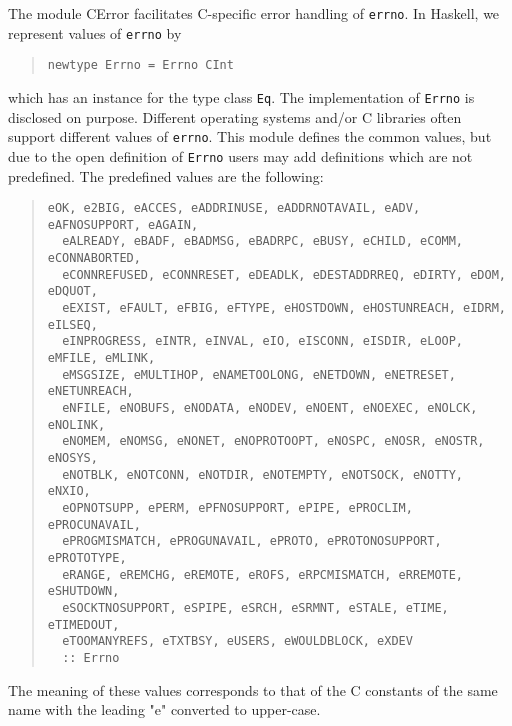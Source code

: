 \documentclass[a4paper,twoside]{article}
\newcommand{\code}[1]{\texttt{#1}}      %
\begin{document}
The module CError facilitates C-specific error handling of \code{errno}.  In
Haskell, we represent values of \code{errno} by
%
\begin{quote}
\begin{verbatim}
newtype Errno = Errno CInt
\end{verbatim}
\end{quote}
%
which has an instance for the type class \code{Eq}.  The implementation of
\code{Errno} is disclosed on purpose.  Different operating systems and/or C
libraries often support different values of \code{errno}.  This module defines
the common values, but due to the open definition of \code{Errno} users may
add definitions which are not predefined.  The predefined values are the
following:
%
\begin{quote}
\begin{verbatim}
eOK, e2BIG, eACCES, eADDRINUSE, eADDRNOTAVAIL, eADV, eAFNOSUPPORT, eAGAIN, 
  eALREADY, eBADF, eBADMSG, eBADRPC, eBUSY, eCHILD, eCOMM, eCONNABORTED, 
  eCONNREFUSED, eCONNRESET, eDEADLK, eDESTADDRREQ, eDIRTY, eDOM, eDQUOT, 
  eEXIST, eFAULT, eFBIG, eFTYPE, eHOSTDOWN, eHOSTUNREACH, eIDRM, eILSEQ, 
  eINPROGRESS, eINTR, eINVAL, eIO, eISCONN, eISDIR, eLOOP, eMFILE, eMLINK, 
  eMSGSIZE, eMULTIHOP, eNAMETOOLONG, eNETDOWN, eNETRESET, eNETUNREACH, 
  eNFILE, eNOBUFS, eNODATA, eNODEV, eNOENT, eNOEXEC, eNOLCK, eNOLINK, 
  eNOMEM, eNOMSG, eNONET, eNOPROTOOPT, eNOSPC, eNOSR, eNOSTR, eNOSYS, 
  eNOTBLK, eNOTCONN, eNOTDIR, eNOTEMPTY, eNOTSOCK, eNOTTY, eNXIO, 
  eOPNOTSUPP, ePERM, ePFNOSUPPORT, ePIPE, ePROCLIM, ePROCUNAVAIL, 
  ePROGMISMATCH, ePROGUNAVAIL, ePROTO, ePROTONOSUPPORT, ePROTOTYPE, 
  eRANGE, eREMCHG, eREMOTE, eROFS, eRPCMISMATCH, eRREMOTE, eSHUTDOWN, 
  eSOCKTNOSUPPORT, eSPIPE, eSRCH, eSRMNT, eSTALE, eTIME, eTIMEDOUT, 
  eTOOMANYREFS, eTXTBSY, eUSERS, eWOULDBLOCK, eXDEV
  :: Errno
\end{verbatim}
\end{quote}
%
The meaning of these values corresponds to that of the C constants of the same
name with the leading "e" converted to upper-case.
\end{document}

